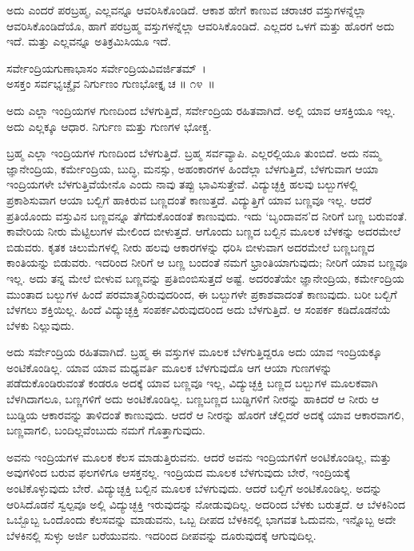 ಅದು ಎಂದರೆ ಪರಬ್ರಹ್ಮ, ಎಲ್ಲವನ್ನೂ ಆವರಿಸಿಕೊಂಡಿದೆ. ಆಕಾಶ ಹೇಗೆ ಕಾಣುವ ಚರಾಚರ ವಸ್ತುಗಳನ್ನೆಲ್ಲಾ ಆವರಿಸಿಕೊಂಡಿದೆಯೊ, ಹಾಗೆ ಪರಬ್ರಹ್ಮ ವಸ್ತುಗಳನ್ನೆಲ್ಲಾ ಆವರಿಸಿಕೊಂಡಿದೆ. ಎಲ್ಲದರ ಒಳಗೆ ಮತ್ತು ಹೊರಗೆ ಅದು ಇದೆ. ಮತ್ತು ಎಲ್ಲವನ್ನೂ ಅತಿಕ್ರಮಿಸಿಯೂ ಇದೆ.

\begin{shloka}
ಸರ್ವೇಂದ್ರಿಯಗುಣಾಭಾಸಂ ಸರ್ವೇಂದ್ರಿಯವಿವರ್ಜಿತಮ್~।\\ಅಸಕ್ತಂ ಸರ್ವಭೃಚ್ಚೈವ ನಿರ್ಗುಣಂ ಗುಣಭೋಕ್ತೃ ಚ \hfill॥ ೧೪~॥
\end{shloka}

\begin{artha}
ಅದು ಎಲ್ಲಾ ಇಂದ್ರಿಯಗಳ ಗುಣದಿಂದ ಬೆಳಗುತ್ತಿದೆ, ಸರ್ವೇಂದ್ರಿಯ ರಹಿತವಾಗಿದೆ. ಅಲ್ಲಿ ಯಾವ ಆಸಕ್ತಿಯೂ ಇಲ್ಲ. ಅದು ಎಲ್ಲಕ್ಕೂ ಆಧಾರ. ನಿರ್ಗುಣ ಮತ್ತು ಗುಣಗಳ ಭೋಕ್ಚ.
\end{artha}

ಬ್ರಹ್ಮ ಎಲ್ಲಾ ಇಂದ್ರಿಯಗಳ ಗುಣದಿಂದ ಬೆಳಗುತ್ತಿದೆ. ಬ್ರಹ್ಮ ಸರ್ವವ್ಯಾಪಿ. ಎಲ್ಲರಲ್ಲಿಯೂ ತುಂಬಿದೆ. ಅದು ನಮ್ಮ ಜ್ಞಾನೇಂದ್ರಿಯ, ಕರ್ಮೇಂದ್ರಿಯ, ಬುದ್ಧಿ, ಮನಸ್ಸು, ಅಹಂಕಾರಗಳ ಹಿಂದೆಲ್ಲಾ ಬೆಳಗುತ್ತಿದೆ, ಬೆಳಗುವಾಗ ಆಯಾ ಇಂದ್ರಿಯಗಳೇ ಬೆಳಗುತ್ತಿವೆಯೇನೊ ಎಂದು ನಾವು ತಪ್ಪು ಭಾವಿಸುತ್ತೇವೆ. ವಿದ್ಯುಚ್ಛಕ್ತಿ ಹಲವು ಬಲ್ಬುಗಳಲ್ಲಿ ಪ್ರಕಾಶಿಸುವಾಗ ಆಯಾ ಬಲ್ಬಿಗೆ ಹಾಕಿರುವ ಬಣ್ಣದಂತೆ ಕಾಣುತ್ತದೆ. ವಿದ್ಯುತ್ತಿಗೆ ಯಾವ ಬಣ್ಣವೂ ಇಲ್ಲ. ಆದರೆ ಪ್ರತಿಯೊಂದು ವಸ್ತುವಿನ ಬಣ್ಣವನ್ನೂ ತೆಗೆದುಕೊಂಡಂತೆ ಕಾಣುವುದು. ಇದು ‘ಬೃಂದಾವನ’ದ ನೀರಿಗೆ ಬಣ್ಣ ಬರುವಂತೆ. ಕಾವೇರಿಯ ನೀರು ಮೆಟ್ಟಿಲುಗಳ ಮೇಲಿಂದ ಬೀಳುತ್ತದೆ. ಆಗೊಂದು ಬಣ್ಣದ ಬಲ್ಬಿನ ಮೂಲಕ ಬೆಳಕನ್ನು ಅದರಮೇಲೆ ಬಿಡುವರು. ಕೃತಕ ಚಿಲುಮೆಗಳಲ್ಲಿ ನೀರು ಹಲವು ಆಕಾರಗಳನ್ನು ಧರಿಸಿ ಬೀಳುವಾಗ ಅದರಮೇಲೆ ಬಣ್ಣಬಣ್ಣದ ಕಾಂತಿಯನ್ನು ಬಿಡುವರು. ಇದರಿಂದ ನೀರಿಗೆ ಆ ಬಣ್ಣ ಬಂದಂತೆ ನಮಗೆ ಭ್ರಾಂತಿಯಾಗುವುದು; ನೀರಿಗೆ ಯಾವ ಬಣ್ಣವೂ ಇಲ್ಲ. ಅದು ತನ್ನ ಮೇಲೆ ಬೀಳುವ ಬಣ್ಣವನ್ನು ಪ್ರತಿಬಿಂಬಿಸುತ್ತದೆ ಅಷ್ಟೆ. ಅದರಂತೆಯೇ ಜ್ಞಾನೇಂದ್ರಿಯ, ಕರ್ಮೇಂದ್ರಿಯ ಮುಂತಾದ ಬಲ್ಬುಗಳ ಹಿಂದೆ ಪರಮಾತ್ಮನಿರುವುದರಿಂದ, ಈ ಬಲ್ಬುಗಳೇ ಪ್ರಕಾಶವಾದಂತೆ ಕಾಣುವುದು. ಬರೀ ಬಲ್ಬಿಗೆ ಬೆಳಗಲು ಶಕ್ತಿಯಿಲ್ಲ. ಹಿಂದೆ ವಿದ್ಯುಚ್ಛಕ್ತಿ ಸಂಪರ್ಕವಿರುವುದರಿಂದ ಅದು ಬೆಳಗುತ್ತಿದೆ. ಆ ಸಂಪರ್ಕ ಕಡಿದೊಡನೆಯೆ ಬೆಳಕು ನಿಲ್ಲುವುದು.

ಅದು ಸರ್ವೇಂದ್ರಿಯ ರಹಿತವಾಗಿದೆ. ಬ್ರಹ್ಮ ಈ ವಸ್ತುಗಳ ಮೂಲಕ ಬೆಳಗುತ್ತಿದ್ದರೂ ಅದು ಯಾವ ಇಂದ್ರಿಯಕ್ಕೂ ಅಂಟಿಕೊಂಡಿಲ್ಲ. ಯಾವ ಯಾವ ಮಧ್ಯವರ್ತಿ ಮೂಲಕ ಬೆಳಗುವುದೊ ಆಗ ಆಯಾ ಗುಣಗಳನ್ನು ಪಡೆದುಕೊಂಡಿರುವಂತೆ ಕಂಡರೂ ಅದಕ್ಕೆ ಯಾವ ಬಣ್ಣವೂ ಇಲ್ಲ, ವಿದ್ಯುಚ್ಛಕ್ತಿ ಬಣ್ಣದ ಬಲ್ಬುಗಳ ಮೂಲಕವಾಗಿ ಬೆಳಗಿದಾಗಲೂ, ಬಣ್ಣಗಳಿಗೆ ಅದು ಅಂಟಿಕೊಂಡಿಲ್ಲ. ಬಣ್ಣಬಣ್ಣದ ಬುಡ್ಡಿಗಳಿಗೆ ನೀರನ್ನು ಹಾಕಿದರೆ ಆ ನೀರು ಆ ಬುಡ್ಡಿಯ ಆಕಾರವನ್ನು ತಾಳಿದಂತೆ ಕಾಣುವುದು. ಆದರೆ ಆ ನೀರನ್ನು ಹೊರಗೆ ಚೆಲ್ಲಿದರೆ ಅದಕ್ಕೆ ಯಾವ ಆಕಾರವಾಗಲಿ, ಬಣ್ಣವಾಗಲಿ, ಬಂದಿಲ್ಲವೆಂಬುದು ನಮಗೆ ಗೊತ್ತಾಗುವುದು.

ಅವನು ಇಂದ್ರಿಯಗಳ ಮೂಲಕ ಕೆಲಸ ಮಾಡುತ್ತಿರುವನು. ಆದರೆ ಅವನು ಇಂದ್ರಿಯಗಳಿಗೆ ಅಂಟಿಕೊಂಡಿಲ್ಲ, ಮತ್ತು ಅವುಗಳಿಂದ ಬರುವ ಫಲಗಳಿಗೂ ಆಸಕ್ತನಲ್ಲ. ಇಂದ್ರಿಯದ ಮೂಲಕ ಬೆಳಗುವುದು ಬೇರೆ, ಇಂದ್ರಿಯಕ್ಕೆ ಅಂಟಿಕೊಳ್ಳುವುದು ಬೇರೆ. ವಿದ್ಯುಚ್ಛಕ್ತಿ ಬಲ್ಬಿನ ಮೂಲಕ ಬೆಳಗುವುದು. ಆದರೆ ಬಲ್ಬಿಗೆ ಅಂಟಿಕೊಂಡಿಲ್ಲ. ಅದನ್ನು ಆರಿಸಿದೊಡನೆ ಸ್ವಲ್ಪವೂ ಅಲ್ಲಿ ವಿದ್ಯುಚ್ಛಕ್ತಿ ಇರುವುದನ್ನು ನೋಡುವುದಿಲ್ಲ. ಅದರಿಂದ ಬೆಳಕು ಬರುತ್ತದೆ. ಆ ಬೆಳಕಿನಿಂದ ಒಬ್ಬೊಬ್ಬ ಒಂದೊಂದು ಕೆಲಸವನ್ನು ಮಾಡುವನು, ಒಬ್ಬ ದೀಪದ ಬೆಳಕಿನಲ್ಲಿ ಭಾಗವತ ಓದುವನು, ಇನ್ನೊಬ್ಬ ಅದೇ ಬೆಳಕಿನಲ್ಲಿ ಸುಳ್ಳು ಅರ್ಜಿ ಬರೆಯುವನು. ಇದರಿಂದ ದೀಪವನ್ನು ದೂರುವುದಕ್ಕೆ ಆಗುವುದಿಲ್ಲ.

